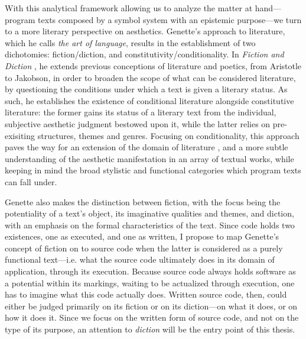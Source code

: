 With this analytical framework allowing us to analyze the matter at hand—program texts composed by a symbol system with an epistemic purpose—we turn to a more literary perspective on aesthetics. Genette's approach to literature, which he calls \emph{the art of language}, results in the establishment of two dichotomies: fiction/diction, and constitutivity/conditionality. In \emph{Fiction and Diction} \citep{genette_fiction_1993}, he extends previous conceptions of literature and poetics, from Aristotle to Jakobson, in order to broaden the scope of what can be considered literature, by questioning the conditions under which a text is given a literary status. As such, he establishes the existence of conditional literature alongside constitutive literature: the former gains its status of a literary text from the individual, subjective aesthetic judgment bestowed upon it, while the latter relies on pre-exisiting structures, themes and genres. Focusing on conditionality, this approach paves the way for an extension of the domain of literature \citep{gefen_extension_2019}, and a more subtle understanding of the aesthetic manifestation in an array of textual works, while keeping in mind the broad stylistic and functional categories which program texts can fall under.

Genette also makes the distinction between fiction, with the focus being the potentiality of a text's object, its imaginative qualities and themes, and diction, with an emphasis on the formal characteristics of the text. Since code holds two existences, one as executed, and one as written, I propose to map Genette's concept of fiction on to source code when the latter is considered as a purely functional text—i.e. what the source code ultimately does in its domain of application, through its execution. Because source code always holds software as a potential within its markings, waiting to be actualized through execution, one has to imagine what this code actually does. Written source code, then, could either be judged primarily on its fiction or on its diction—on what it does, or on how it does it. Since we focus on the written form of source code, and not on the type of its purpose, an attention to \emph{diction} will be the entry point of this thesis.

